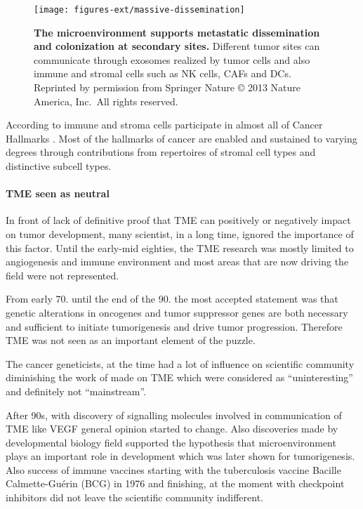 \documentclass[12pt,]{book}
\let\oldparagraph\paragraph
\renewcommand{\paragraph}[1]{\oldparagraph{#1}\mbox{}}
\theoremstyle{definition}
\theoremstyle{definition}
\theoremstyle{definition}
\theoremstyle{remark}
\begin{document}
\begin{figure}

{\centering \texttt{[image: figures-ext/massive-dissemination]} 

}

\caption[The microenvironment supports metastatic dissemination and colonization at secondary sites.]{\textbf{The microenvironment supports metastatic
dissemination and colonization at secondary sites.} Different tumor
sites can communicate through exosomes realized by tumor cells and also
immune and stromal cells such as NK cells, CAFs and DCs. Reprinted by
permission from Springer Nature \citep{Quail2013} © 2013 Nature America,
Inc.~All rights reserved.}\label{fig:met-dis}
\end{figure}








According to \citep{Hanahan2012} immune and stroma cells participate in
almost all of Cancer Hallmarks \citep{Hanahan2000, Hanahan2012}. Most of
the hallmarks of cancer are enabled and sustained to varying degrees
through contributions from repertoires of stromal cell types and
distinctive subcell types.

\hypertarget{tme-seen-as-neutral}{%
\paragraph{TME seen as neutral}\label{tme-seen-as-neutral}}

In front of lack of definitive proof that TME can positively or
negatively impact on tumor development, many scientist, in a long time,
ignored the importance of this factor. Until the early-mid eighties, the
TME research was mostly limited to angiogenesis and immune environment
and most areas that are now driving the field were not represented.

From early 70. until the end of the 90. the most accepted statement was
that genetic alterations in oncogenes and tumor suppressor genes are
both necessary and sufficient to initiate tumorigenesis and drive tumor
progression. Therefore TME was not seen as an important element of the
puzzle.

The cancer geneticists, at the time had a lot of influence on scientific
community diminishing the work of made on TME which were considered as
``uninteresting'' and definitely not ``mainstream''.

After 90s, with discovery of signalling molecules involved in
communication of TME like VEGF general opinion started to change. Also
discoveries made by developmental biology field supported the hypothesis
that microenvironment plays an important role in development which was
later shown for tumorigenesis. Also success of immune vaccines starting
with the tuberculosis vaccine Bacille Calmette-Guérin (BCG) in 1976 and
finishing, at the moment with checkpoint inhibitors did not leave the
scientific community indifferent.
\end{document}
